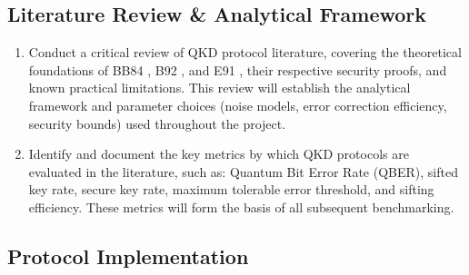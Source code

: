\documentclass[10pt, a4paper]{report}
\begin{document}
\subsection{Literature Review \& Analytical Framework}

\begin{enumerate}[label=\textbf{O1.\arabic*}, leftmargin=1.5cm]
    \item Conduct a critical review of QKD protocol literature, covering the theoretical foundations of BB84 \cite{BB84}, B92 \cite{B92}, and E91 \cite{E91}, their respective security proofs, and known practical limitations. This review will establish the analytical framework and parameter choices (noise models, error correction efficiency, security bounds) used throughout the project.

    \item Identify and document the key metrics by which QKD protocols are evaluated in the literature, such as: Quantum Bit Error Rate (QBER), sifted key rate, secure key rate, maximum tolerable error threshold, and sifting efficiency. These metrics will form the basis of all subsequent benchmarking.
\end{enumerate}

\subsection{Protocol Implementation}
\end{document}
